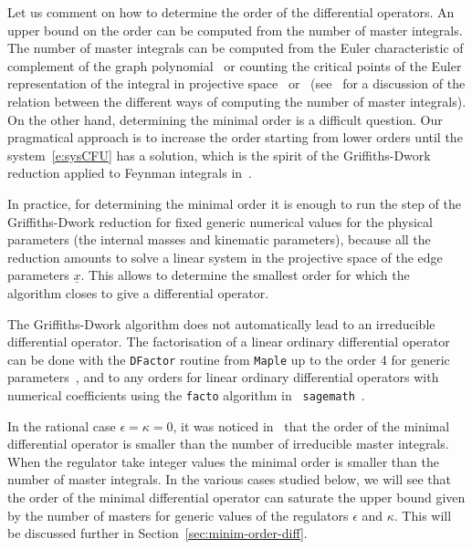 \documentclass[a4paper,12pt]{article}
\numberwithin{equation}{section}
\numberwithin{figure}{section}
\begin{document}
\medskip
 
 Let us comment on how to determine the order of the differential operators. An upper bound on the order can be computed
 from the number of master integrals.
 The number of master
integrals  can be computed from the Euler
characteristic of complement of the graph polynomial~\cite{Bitoun:2017nre} or counting the
critical points of the Euler representation of the integral in
projective
space~\cite{Lee:2013hzt,Cacciatori:2021nli}
or~\cite{Mastrolia:2018uzb,Frellesvig:2019uqt} (see~\cite{Agostini:2022cgv} for
a discussion of the relation between the different ways of computing the number of master
integrals). On the other hand, determining the minimal order is a
difficult question. Our pragmatical approach is to increase the order
starting from 
lower orders until the system~\eqref{e:sysCFU} has a solution, which is
the spirit of the Griffiths-Dwork reduction applied to Feynman
integrals in~\cite{Muller-Stach:2011qkg}.

In practice, for determining the minimal order it is enough to run the step of the
Griffiths-Dwork reduction for fixed generic numerical values for the physical
parameters (the internal masses and kinematic
parameters), because all the reduction amounts to solve a linear system in the projective space of
the edge parameters $\underline x$. This allows to determine the smallest order for which the
algorithm closes to give a differential operator.

The Griffiths-Dwork algorithm does not automatically
lead to an irreducible differential operator.
The factorisation of a linear ordinary
differential operator can be done with the {\tt DFactor} routine from
{\tt Maple} up to the order 4 for generic parameters~\cite{PutSinger,vanHoeij}, and to any
orders for linear  ordinary
differential operators with numerical coefficients
using the {\tt facto} algorithm in {\tt
	sagemath}~\cite{chyzak2022symbolic,goyer2021sage}.


 In the rational case $\epsilon=\kappa=0$, it was noticed
in~\cite{Bloch:2013tra,Bloch:2016izu,Bloch:2014qca,Lairez:2022zkj} that the order of the minimal differential operator is
smaller than the number of irreducible master integrals.
When the regulator take integer values the minimal order is smaller
than the number of master integrals. 
In the various cases studied below,
we will see that the order of the minimal differential operator can saturate
the upper bound given by the number of masters for generic values of
the regulators  $\epsilon$  and $\kappa$. 
This will
      be discussed further in Section~\ref{sec:minim-order-diff}.
\end{document}
